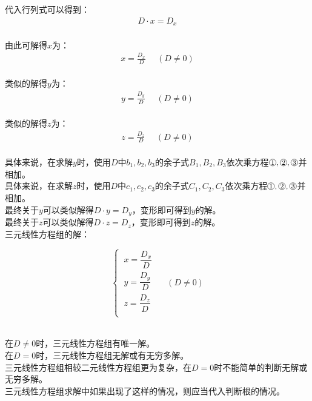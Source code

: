 \documentclass[UTF8]{ctexart}
\newcommand*{\circled}[1]{\lower.7ex\hbox{\tikz\draw (0pt, 0pt)circle (.4em) node {\makebox[0em][c]{\footnotesize #1}};}}
\begin{document}
    代入行列式可以得到：
    \begin{align}
        D\cdot x=D_x
    \end{align}\\
    由此可解得$x$为：
    \begin{align}
        x=\frac{D_x}{D}~~~~~~(D\neq 0)
    \end{align}\\
    类似的解得$y$为：
    \begin{align}
        y=\frac{D_y}{D}~~~~~~(D\neq 0)
    \end{align}\\
    类似的解得$z$为：
    \begin{align}
        z=\frac{D_z}{D}~~~~~~(D\neq 0)
    \end{align}\\
    具体来说，在求解$y$时，使用$D$中$b_1,b_2,b_3$的余子式$B_1,B_2,B_3$依次乘方程$\circled{1},\circled{2},\circled{3}$并相加。\\[3mm]
    具体来说，在求解$z$时，使用$D$中$c_1,c_2,c_3$的余子式$C_1,C_2,C_3$依次乘方程$\circled{1},\circled{2},\circled{3}$并相加。\\[3mm]
    最终关于$y$可以类似解得$D\cdot y=D_y$，变形即可得到$y$的解。\\[3mm]
    最终关于$z$可以类似解得$D\cdot z=D_z$，变形即可得到$z$的解。\\[10mm]
    三元线性方程组的解：
    \begin{large}
        \begin{equation*}
            \begin{cases}
                ~x=\dfrac{D_x}{D} \\[6mm]
                ~y=\dfrac{D_y}{D} \\[6mm]
                ~z=\dfrac{D_z}{D} \\
            \end{cases}~~~~~~(D\neq 0)
        \end{equation*}
    \end{large}\\[3mm]
    在$D\neq 0$时，三元线性方程组有唯一解。\\[3mm]
    在$D=0$时，三元线性方程组无解或有无穷多解。\\[3mm]
    三元线性方程组相较二元线性方程组更为复杂，在$D=0$时不能简单的判断无解或无穷多解。\\[3mm]
    三元线性方程组求解中如果出现了这样的情况，则应当代入判断根的情况。

\newpage
\end{document}
